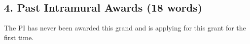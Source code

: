 \documentclass[12pt,letterpaper]{article}
\theoremstyle{definition}
\begin{document}
\subsection*{\hfil 4. Past Intramural Awards (18 words)\hfil}
The PI has never been awarded this grand and is applying for this grant for the first time.
\end{document}
